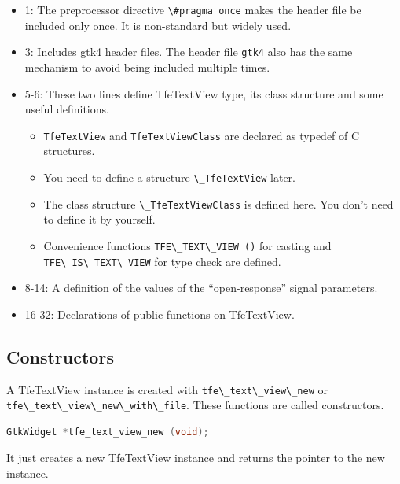 \begin{itemize}
\tightlist
\item
  1: The preprocessor directive \passthrough{\lstinline!\#pragma once!}
  makes the header file be included only once. It is non-standard but
  widely used.
\item
  3: Includes gtk4 header files. The header file
  \passthrough{\lstinline!gtk4!} also has the same mechanism to avoid
  being included multiple times.
\item
  5-6: These two lines define TfeTextView type, its class structure and
  some useful definitions.

  \begin{itemize}
  \tightlist
  \item
    \passthrough{\lstinline!TfeTextView!} and
    \passthrough{\lstinline!TfeTextViewClass!} are declared as typedef
    of C structures.
  \item
    You need to define a structure
    \passthrough{\lstinline!\_TfeTextView!} later.
  \item
    The class structure \passthrough{\lstinline!\_TfeTextViewClass!} is
    defined here. You don't need to define it by yourself.
  \item
    Convenience functions \passthrough{\lstinline!TFE\_TEXT\_VIEW ()!}
    for casting and \passthrough{\lstinline!TFE\_IS\_TEXT\_VIEW!} for
    type check are defined.
  \end{itemize}
\item
  8-14: A definition of the values of the ``open-response'' signal
  parameters.
\item
  16-32: Declarations of public functions on TfeTextView.
\end{itemize}

\subsection{Constructors}\label{constructors}

A TfeTextView instance is created with
\passthrough{\lstinline!tfe\_text\_view\_new!} or
\passthrough{\lstinline!tfe\_text\_view\_new\_with\_file!}. These
functions are called constructors.

\begin{lstlisting}[language=C]
GtkWidget *tfe_text_view_new (void);
\end{lstlisting}

It just creates a new TfeTextView instance and returns the pointer to
the new instance.

